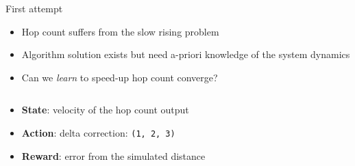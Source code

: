 \begin{frame}{\playfairblack First attempt}
  \begin{card}
    \begin{itemize}
      \item Hop count suffers from the slow rising problem
      \item Algorithm solution exists but need a-priori knowledge of the system dynamics
      \item Can we \emph{learn} to speed-up hop count converge?
    \end{itemize}
  \end{card}
  \begin{columns}[onlytextwidth, t]
    \begin{column}{0.5\textwidth}
      \begin{card}
        \begin{itemize}
          \item \textbf{State}: velocity of the hop count output
          \item \textbf{Action}: delta correction: \texttt{(1, 2, 3)}
          \item \textbf{Reward}: error from the simulated distance
        \end{itemize}
      \end{card}
    \end{column}
    \begin{column}{0.29\textwidth}
    \end{column}
  \end{columns}
  
\end{frame}